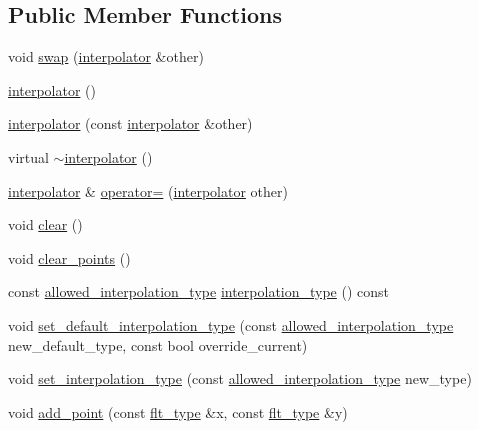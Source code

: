 \subsection*{Public Member Functions}
\begin{DoxyCompactItemize}
\item 
void \hyperlink{classIceBRG_1_1interpolator_a488f11b2ff91e3f456262044751605c1}{swap} (\hyperlink{classIceBRG_1_1interpolator}{interpolator} \&other)
\item 
\hyperlink{classIceBRG_1_1interpolator_af9b52bd9f9bff5bcf2b889bf85c1403e}{interpolator} ()
\item 
\hyperlink{classIceBRG_1_1interpolator_a719e0c86158635e78a37832af704e099}{interpolator} (const \hyperlink{classIceBRG_1_1interpolator}{interpolator} \&other)
\item 
virtual \hyperlink{classIceBRG_1_1interpolator_a52f31fe44b62983db86549c3c97773e9}{$\sim$interpolator} ()
\item 
\hyperlink{classIceBRG_1_1interpolator}{interpolator} \& \hyperlink{classIceBRG_1_1interpolator_ad65df5a080aa25a23fa25b5d7b9554e0}{operator=} (\hyperlink{classIceBRG_1_1interpolator}{interpolator} other)
\item 
void \hyperlink{classIceBRG_1_1interpolator_a747f23ddfe74f619735585b0b3066f24}{clear} ()
\item 
void \hyperlink{classIceBRG_1_1interpolator_aad3a72c0c8903d0fad7e60b6dd348ba3}{clear\+\_\+points} ()
\item 
const \hyperlink{classIceBRG_1_1interpolator_af85c1c6a292cff6fa033c8884377544a}{allowed\+\_\+interpolation\+\_\+type} \hyperlink{classIceBRG_1_1interpolator_a8caf984a6aec487fcc5f1afc54fa6f00}{interpolation\+\_\+type} () const 
\item 
void \hyperlink{classIceBRG_1_1interpolator_a3651662a03abe69c94c6c92cae5bb93b}{set\+\_\+default\+\_\+interpolation\+\_\+type} (const \hyperlink{classIceBRG_1_1interpolator_af85c1c6a292cff6fa033c8884377544a}{allowed\+\_\+interpolation\+\_\+type} new\+\_\+default\+\_\+type, const bool override\+\_\+current)
\item 
void \hyperlink{classIceBRG_1_1interpolator_ada00768286864c05246f3bbe2862093e}{set\+\_\+interpolation\+\_\+type} (const \hyperlink{classIceBRG_1_1interpolator_af85c1c6a292cff6fa033c8884377544a}{allowed\+\_\+interpolation\+\_\+type} new\+\_\+type)
\item 
void \hyperlink{classIceBRG_1_1interpolator_a8ef091301e4ca894181bc1b267b5d42a}{add\+\_\+point} (const \hyperlink{lib_2IceBRG__main_2common_8h_ad0f130a56eeb944d9ef2692ee881ecc4}{flt\+\_\+type} \&x, const \hyperlink{lib_2IceBRG__main_2common_8h_ad0f130a56eeb944d9ef2692ee881ecc4}{flt\+\_\+type} \&y)

\end{DoxyCompactItemize}
